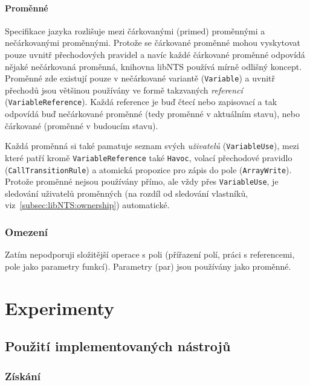 \documentclass[10pt,a4paper,notitlepage]{report}
\begin{document}

\subsubsection{Proměnné}
Specifikace jazyka rozlišuje mezi čárkovanými (primed) proměnnými a nečárkovanými proměnnými. Protože se čárkované proměnné mohou vyskytovat pouze uvnitř přechodových pravidel a navíc každé čárkované proměnné odpovídá nějaké nečárkovaná proměnná, knihovna libNTS používá mírně odlišný koncept. Proměnné zde existují pouze v nečárkované variantě (\texttt{Variable}) a uvnitř přechodů jsou většinou používány ve formě takzvaných \textit{referencí} (\texttt{VariableReference}). Každá reference je buď čtecí nebo zapisovací a tak odpovídá buď nečárkované proměnné (tedy proměnné v aktuálním stavu), nebo čárkované (proměnné v budoucím stavu).

\label{subsec:libNTS:variable:use}
Každá proměnná si také pamatuje seznam svých \textit{uživatelů} (\texttt{VariableUse}), mezi které patří kromě \texttt{VariableReference} také \texttt{Havoc}, volací přechodové pravidlo (\texttt{CallTransitionRule}) a atomická propozice pro zápis do pole (\texttt{ArrayWrite}). Protože proměnné nejsou používány přímo, ale vždy přes \texttt{VariableUse}, je sledování uživatelů proměnných (na rozdíl od sledování vlastníků, viz~\ref{subsec:libNTS:ownership}) automatické.

\subsection{Omezení}
Zatím nepodporuji složitější operace s poli (přířazení polí, práci s referencemi, pole jako parametry funkcí). Parametry (par) jsou používány jako proměnné.


\chapter{Experimenty}
\section{Použití implementovaných nástrojů}
\subsection{Získání}
\end{document}
